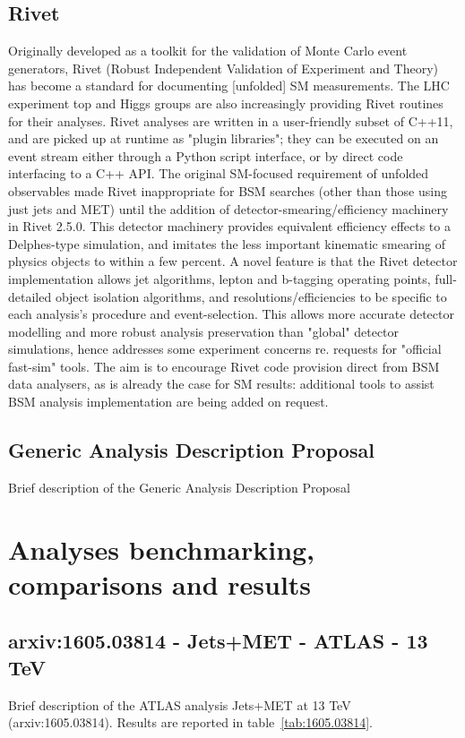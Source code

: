 \documentclass[11pt]{cernrep}
\begin{document}
\subsection{Rivet}
Originally developed as a toolkit for the validation of Monte Carlo event generators, Rivet (Robust Independent Validation of Experiment and Theory) has become a standard for documenting [unfolded] SM measurements. The LHC experiment top and Higgs groups are also increasingly providing Rivet routines for their analyses. Rivet analyses are written in a user-friendly subset of C++11, and are picked up at runtime as "plugin libraries"; they can be executed on an event stream either through a Python script interface, or by direct code interfacing to a C++ API.
The original SM-focused requirement of unfolded observables made Rivet inappropriate for BSM searches (other than those using just jets and MET) until the addition of detector-smearing/efficiency machinery in Rivet 2.5.0. This detector machinery provides equivalent efficiency effects to a Delphes-type simulation, and imitates the less important kinematic smearing of physics objects to within a few percent. A novel feature is that the Rivet detector implementation allows jet algorithms, lepton and b-tagging operating points, full-detailed object isolation algorithms, and resolutions/efficiencies to be specific to each analysis's procedure and event-selection. This allows more accurate detector modelling and more robust analysis preservation than "global" detector simulations, hence addresses some experiment concerns re. requests for "official fast-sim" tools. The aim is to encourage Rivet code provision direct from BSM data analysers, as is already the case for SM results: additional tools to assist BSM analysis implementation are being added on request.

\subsection{Generic Analysis Description Proposal}
Brief description of the Generic Analysis Description Proposal

\section{Analyses benchmarking, comparisons and results}

\subsection{arxiv:1605.03814 - Jets+MET - ATLAS - 13 TeV}
Brief description of the ATLAS analysis Jets+MET at 13 TeV (arxiv:1605.03814). 
Results are reported in table~\ref{tab:1605.03814}.
\end{document}
